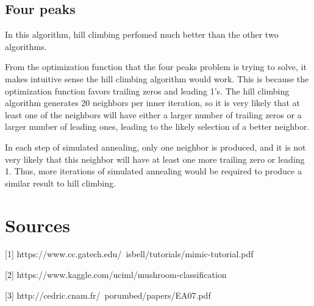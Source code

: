 \documentclass[11pt]{article}
\begin{document}
        \subsection{Four peaks}

        In this algorithm, hill climbing perfomed much better than the other two algorithms.

        From the optimization function that the four peaks problem is trying to solve, it makes
        intuitive sense the hill climbing algorithm would work. This is because the optimization
        function favors trailing zeros and leading 1's. The hill climbing algorithm generates 20
        neighbors per inner iteration, so it is very likely that at least one of the neighbors will
        have either a larger number of trailing zeros or a larger number of leading ones, leading
        to the likely selection of a better neighbor.

        In each step of simulated annealing, only one neighbor is produced, and it is not very likely that this
        neighbor will have at least one more trailing zero or leading 1. Thus, more iterations of simulated annealing
        would be required to produce a similar result to hill climbing.
        \section{Sources}

        [1] https://www.cc.gatech.edu/~isbell/tutorials/mimic-tutorial.pdf

        [2] https://www.kaggle.com/uciml/mushroom-classification

        [3] http://cedric.cnam.fr/~porumbed/papers/EA07.pdf

    
\end{document}
